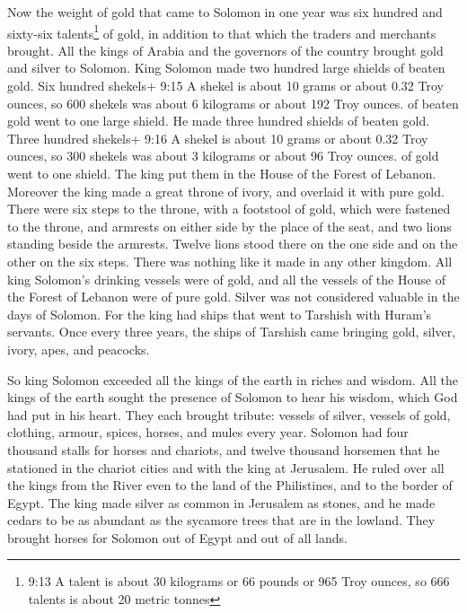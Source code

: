  Now the weight of gold that came to Solomon in one year
was six hundred and sixty-six talents\footnote{9:13 A talent is about 30
  kilograms or 66 pounds or 965 Troy ounces, so 666 talents is about 20
  metric tonnes} of gold,  in addition to that which the
traders and merchants brought. All the kings of Arabia and the governors
of the country brought gold and silver to Solomon.  King
Solomon made two hundred large shields of beaten gold. Six hundred
shekels+ 9:15 A shekel is about 10 grams or about 0.32 Troy ounces, so
600 shekels was about 6 kilograms or about 192 Troy ounces. of beaten
gold went to one large shield.  He made three hundred
shields of beaten gold. Three hundred shekels+ 9:16 A shekel is about 10
grams or about 0.32 Troy ounces, so 300 shekels was about 3 kilograms or
about 96 Troy ounces. of gold went to one shield. The king put them in
the House of the Forest of Lebanon.  Moreover the king made
a great throne of ivory, and overlaid it with pure gold. 
There were six steps to the throne, with a footstool of gold, which were
fastened to the throne, and armrests on either side by the place of the
seat, and two lions standing beside the armrests.  Twelve
lions stood there on the one side and on the other on the six steps.
There was nothing like it made in any other kingdom.  All
king Solomon's drinking vessels were of gold, and all the vessels of the
House of the Forest of Lebanon were of pure gold. Silver was not
considered valuable in the days of Solomon.  For the king
had ships that went to Tarshish with Huram's servants. Once every three
years, the ships of Tarshish came bringing gold, silver, ivory, apes,
and peacocks.

 So king Solomon exceeded all the kings of the earth in
riches and wisdom.  All the kings of the earth sought the
presence of Solomon to hear his wisdom, which God had put in his heart.
 They each brought tribute: vessels of silver, vessels of
gold, clothing, armour, spices, horses, and mules every year.
 Solomon had four thousand stalls for horses and chariots,
and twelve thousand horsemen that he stationed in the chariot cities and
with the king at Jerusalem.  He ruled over all the kings
from the River even to the land of the Philistines, and to the border of
Egypt.  The king made silver as common in Jerusalem as
stones, and he made cedars to be as abundant as the sycamore trees that
are in the lowland.  They brought horses for Solomon out of
Egypt and out of all lands.

